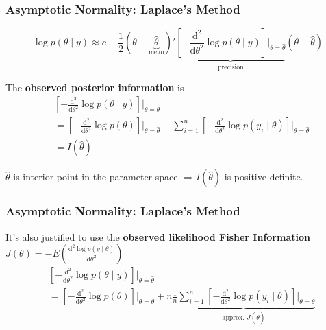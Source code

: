 \documentclass{beamer}
\begin{document}
\begin{frame}
\frametitle{Asymptotic Normality: Laplace's Method}

\[
\log p(\theta \mid y ) \approx 
c  - \frac{1}{2}(\theta - \underbrace{\hat{\theta} }_{\text{mean}} )' \underbrace{\left[-\frac{\text{d}^2}{\text{d}\theta^2} \log p(\theta \mid y)\right] \bigg|_{\theta = \hat{\theta}}}_{\text{precision} } (\theta - \hat{\theta})
\]

The {\bf observed posterior information} is
\begin{align*}
&\left[-\frac{\text{d}^2}{\text{d}\theta^2} \log p(\theta \mid y)\right] \bigg|_{\theta = \hat{\theta}} \\
&=
\left[-\frac{\text{d}^2}{\text{d}\theta^2} \log p(\theta)\right] \bigg|_{\theta = \hat{\theta}} +
\sum_{i=1}^n \left[-\frac{\text{d}^2}{\text{d}\theta^2} \log p(y_i \mid \theta)\right] \bigg|_{\theta = \hat{\theta}}\\
&= I(\hat{\theta})  
\end{align*}

$\hat{\theta}$ is interior point in the parameter space $\Rightarrow
I(\hat{\theta})$ is positive definite.


\end{frame}

\begin{frame}
\frametitle{Asymptotic Normality: Laplace's Method}

It's also justified to use the {\bf observed likelihood Fisher Information} $J(\theta) = -E\left(\frac{\text{d}^2 \log p(y \mid \theta) }{\text{d} \theta^2 } \right)$
\begin{align*}
&\left[-\frac{\text{d}^2}{\text{d}\theta^2} \log p(\theta \mid y)\right] \bigg|_{\theta = \hat{\theta}} \\
&=
\left[-\frac{\text{d}^2}{\text{d}\theta^2} \log p(\theta)\right] \bigg|_{\theta = \hat{\theta}} +
n \underbrace{\frac{1}{n}\sum_{i=1}^n \left[-\frac{\text{d}^2}{\text{d}\theta^2} \log p(y_i \mid \theta)\right] \bigg|_{\theta = \hat{\theta}}}_{ \text{approx. } J(\hat{\theta} )}
\end{align*}



\end{frame}
\end{document}
